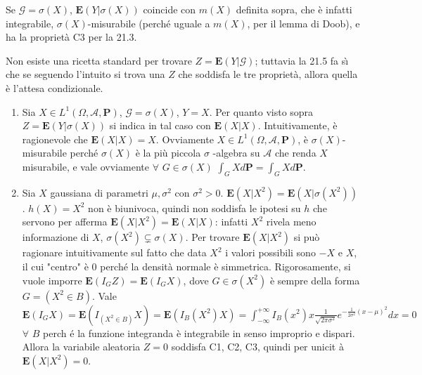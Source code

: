 \documentclass{article}
\begin{document}
Se $\mathcal{G}=\sigma \left( X\right) $, $\mathbf{E}\left( Y|\sigma \left(
X\right) \right) $ coincide con $m\left( X\right) $ definita sopra, che \`{e}
infatti integrabile, $\sigma \left( X\right) $-misurabile (perch\'{e} uguale
a $m\left( X\right) $, per il lemma di Doob), e ha la propriet\`{a} C3 per
la 21.3.

Non esiste una ricetta standard per trovare $Z=\mathbf{E}\left( Y|\mathcal{G}%
\right) $; tuttavia la 21.5 fa s\`{\i} che se seguendo l'intuito si trova
una $Z$ che soddisfa le tre propriet\`{a}, allora quella \`{e} l'attesa
condizionale.

\begin{enumerate}
\item Sia $X\in L^{1}\left( \Omega ,\mathcal{A},\mathbf{P}\right) $, $%
\mathcal{G}=\sigma \left( X\right) $, $Y=X$. Per quanto visto sopra $Z=%
\mathbf{E}\left( Y|\sigma \left( X\right) \right) $ si indica in tal caso
con $\mathbf{E}\left( X|X\right) $. Intuitivamente, \`{e} ragionevole che $%
\mathbf{E}\left( X|X\right) =X$. Ovviamente $X\in L^{1}\left( \Omega ,%
\mathcal{A},\mathbf{P}\right) $, \`{e} $\sigma \left( X\right) $-misurabile
perch\'{e} $\sigma \left( X\right) $ \`{e} la pi\`{u} piccola $\sigma $%
-algebra su $\mathcal{A}$ che renda $X$ misurabile, e vale ovviamente $%
\forall $ $G\in \sigma \left( X\right) $ $\int_{G}Xd\mathbf{P=}\int_{G}Xd%
\mathbf{P}$.

\item Sia $X$ gaussiana di parametri $\mu ,\sigma ^{2}$ con $\sigma ^{2}>0$. 
$\mathbf{E}\left( X|X^{2}\right) =\mathbf{E}\left( X|\sigma \left(
X^{2}\right) \right) $. $h\left( X\right) =X^{2}$ non \`{e} biunivoca,
quindi non soddisfa le ipotesi su $h$ che servono per afferma $\mathbf{E}%
\left( X|X^{2}\right) =\mathbf{E}\left( X|X\right) $: infatti $X^{2}$ rivela
meno informazione di $X$, $\sigma \left( X^{2}\right) \varsubsetneq \sigma
\left( X\right) $. Per trovare $\mathbf{E}\left( X|X^{2}\right) $ si pu\`{o}
ragionare intuitivamente sul fatto che data $X^{2}$ i valori possibili sono $%
-X$ e $X$, il cui "centro" \`{e} $0$ perch\'{e} la densit\`{a} normale \`{e}
simmetrica. Rigorosamente, si vuole imporre $\mathbf{E}\left( I_{G}Z\right) =%
\mathbf{E}\left( I_{G}X\right) $, dove $G\in \sigma \left( X^{2}\right) $ 
\`{e} sempre della forma $G=\left( X^{2}\in B\right) $. Vale $\mathbf{E}%
\left( I_{G}X\right) =\mathbf{E}\left( I_{\left( X^{2}\in B\right) }X\right)
=\mathbf{E}\left( I_{B}\left( X^{2}\right) X\right) =\int_{-\infty
}^{+\infty }I_{B}\left( x^{2}\right) x\frac{1}{\sqrt{2\pi \sigma ^{2}}}e^{-%
\frac{1}{2\sigma ^{2}}\left( x-\mu \right) ^{2}}dx=0$ $\forall $ $B$ perch%
\'{e} la funzione integranda \`{e} integrabile in senso improprio e dispari.
Allora la variabile aleatoria $Z=0$ soddisfa C1, C2, C3, quindi per unicit%
\`{a} $\mathbf{E}\left( X|X^{2}\right) =0$.
\end{enumerate}
\end{document}
